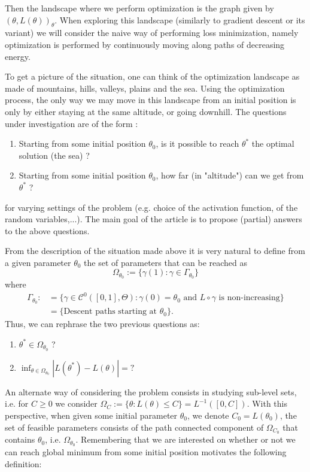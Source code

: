 \documentclass[11pt]{article} %
\begin{document}
Then the landscape where we perform optimization is the graph given by $(\theta, L(\theta))_\theta$. 
When exploring this landscape (similarly to gradient descent or its variant) we will consider the naive way of performing loss minimization, namely optimization is performed by continuously moving along paths of decreasing energy.
\par
To get a picture of the situation, one can think of the optimization landscape as made of mountains, hills, valleys, plains and the sea.  Using the optimization process, the only way we may move in this landscape from an initial position is only by either staying at the same altitude, or going downhill. The questions under investigation are of the form :
\begin{enumerate}
	\item Starting from some initial position $\theta_0$, is it possible to reach $\theta^*$ the optimal solution (the sea) ?
	\item Starting from some initial position $\theta_0$, how far (in "altitude") can we get from $\theta^*$ ?
\end{enumerate}
for varying settings of the problem (e.g. choice of the activation function, of the random variables,...).
The main goal of the article is to propose (partial) answers to the above questions. 
\par
From the description of the situation made above it is very natural to define from a given parameter $\theta_0$ the set of parameters that can be reached as
\begin{equation}
	\Omega_{\theta_0} := \{ \gamma(1) : \gamma \in \Gamma_{\theta_0} \}
\end{equation}
where 
\begin{align*}
	\Gamma_{\theta_0} :&=  \{ \gamma \in \mathcal{C}^0([0,1], \Theta) :\gamma(0) = \theta_0 \text{ and } L \circ \gamma \text{ is non-increasing}\} \\
	&=\{\text{Descent paths starting at $\theta_0$}\}.
\end{align*}
Thus, we can rephrase the two previous questions as:
\begin{enumerate}
	\item $\theta^* \in \Omega_{\theta_0}$ ?
	\item $\inf_{\theta \in \Omega_{\theta_0}} |L(\theta^*) - L(\theta)| = ?$
\end{enumerate}
An alternate way of considering the problem consists in studying sub-level sets, i.e. for $C\geq 0$ we consider $\Omega_C := \{\theta : L(\theta) \leq C\} = L^{-1}([0,C])$. With this perspective, when given some initial parameter $\theta_0$, we denote $C_0 = L(\theta_0)$, the set of feasible parameters consists of the path connected component of $\Omega_{C_0}$ that contains $\theta_0$, i.e. $\Omega_{\theta_0}$. Remembering that we are interested on whether or not we can reach global minimum from some initial position motivates the following definition:
\end{document}
